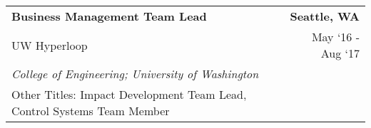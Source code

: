 \documentclass[10pt, letterpaper]{letter}
\begin{document}
        \begin{tabularx}{\textwidth}{X r}
            \textbf{Business Management Team Lead} & \textbf{Seattle, 
        WA} \\
            UW Hyperloop & 
        
    May ‘16 - 
    Aug ‘17 \\
            
                \textit{College of Engineering; University of Washington} & \\
            
            
                Other Titles: Impact Development Team Lead, Control Systems Team Member & \\
            
        \end{tabularx}
        \vspace{-1em}
\end{document}
